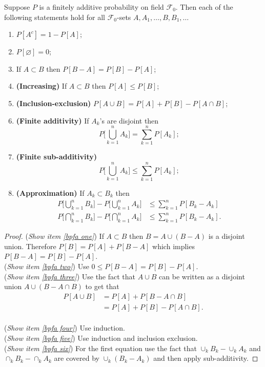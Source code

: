 \begin{theorem}
Suppose $P$ is a  finitely additive probability on field $\mathcal F_0$. Then each of the following statements hold for all $\mathcal F_0$-sets $A, A_1, \ldots, B, B_1, \ldots$
\begin{enumerate}
\item $P[A^c] = 1-P[A]$;
\item $P[\varnothing]=0$;
\item\label{bpfa one} If $A\subset B$ then $P[B-A]=P[B]-P[A]$;
\item\label{bpfa two} {\bf (Increasing)} If $A\subset B$ then  $P[A]\leq P[B]$;
\item\label{bpfa three} {\bf (Inclusion-exclusion)} $P[A\cup B] = P[A]+P[B]-P[A\cap B]$;
\item\label{bpfa four} {\bf (Finite additivity)}  If $A_k$'s are disjoint then
\[ P\bigl[ \bigcup_{k=1}^n A_k \bigr] = \sum_{k=1}^n P[A_k]; \]
\item\label{bpfa five} {\bf (Finite sub-additivity)}
\[ P\bigl[ \bigcup_{k=1}^n A_k \bigr] \leq \sum_{k=1}^n P[A_k]; \]
\item\label{bpfa six} {\bf (Approximation)} If $A_k\subset B_k$ then
\begin{align*}
P\bigl[ \bigcup_{k=1}^n B_k \bigr] - P\bigl[ \bigcup_{k=1}^n A_k \bigr] &\leq \sum_{k=1}^n P[B_k - A_k] \\
P\bigl[ \bigcap_{k=1}^n B_k \bigr] - P\bigl[ \bigcap_{k=1}^n A_k \bigr] &\leq \sum_{k=1}^n P[B_k - A_k].
\end{align*}
\end{enumerate}
\end{theorem}
\begin{proof}
\textbullet({\sl Show item \ref{bpfa one}}) If $A\subset B$ then $B = A \cup (B-A)$ is a disjoint union. Therefore $P[B] = P[A] + P[B-A]$ which implies $P[B-A]=P[B]-P[A]$.
\\
\textbullet({\sl Show item \ref{bpfa two}}) Use $0\leq P[B-A]=P[B]-P[A]$.
\\
\textbullet({\sl Show item \ref{bpfa three}}) Use the fact that $A\cup B$ can be written as a disjoint union ${A \cup (B-A\cap B)}$ to get that
\begin{align*}
P[A\cup B]&= P[A] + P[B-A\cap B] \\
&= P[A] + P[B] - P[A\cap B].
\end{align*}
\\
\textbullet({\sl Show item \ref{bpfa four}}) Use induction.
\\
\textbullet({\sl Show item \ref{bpfa five}}) Use induction and inclusion exclusion.
\\
\textbullet({\sl Show item \ref{bpfa six}})
For the first equation use the fact that $\cup_k B_k - \cup_k A_k$ and $\cap_k B_k - \cap_k A_k$  are covered by $\cup_k(B_k - A_k)$ and then apply sub-additivity.

\end{proof}

